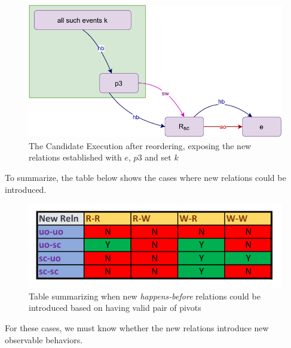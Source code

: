     \begin{figure}[H]
        \centering
        \includegraphics[scale=0.7]{5.InstructionReordering/4.ValidReorderingCandidate/ProofParts/Part2/part2(d).pdf}
        \caption{The Candidate Execution after reordering, exposing the new relations established with $e$, $p3$ and set $k$}
        \label{fig:my_label}
    \end{figure}



    To summarize, the table below shows the cases where new relations could be introduced. 
    \begin{figure}[H]
        \centering
        \includegraphics[scale=0.7]{5.InstructionReordering/4.ValidReorderingCandidate/ProofParts/Part2/part2_table.pdf}
        \caption{Table summarizing when new \textit{happens-before} relations could be introduced based on having valid pair of pivots }
        \label{fig:my_label}
    \end{figure}

    For these cases, we must know whether the new relations introduce new observable behaviors. 
